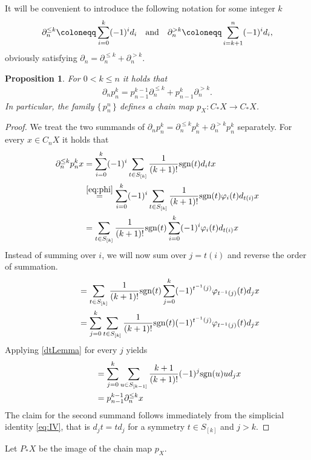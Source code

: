 \documentclass[12pt]{amsart}
\theoremstyle{plain}
\numberwithin{lemma}{\DefaultNumberTheoremWithin}
\numberwithin{claim}{\DefaultNumberTheoremWithin}
\numberwithin{theorem}{\DefaultNumberTheoremWithin}
\numberwithin{corollary}{\DefaultNumberTheoremWithin}
\newtheorem{proposition}{Proposition}
\numberwithin{proposition}{\DefaultNumberTheoremWithin}
\numberwithin{conjecture}{\DefaultNumberTheoremWithin}
\theoremstyle{definition}
\theoremstyle{definition}
\numberwithin{question}{\DefaultNumberTheoremWithin}
\theoremstyle{definition}
\numberwithin{problem}{\DefaultNumberTheoremWithin}
\theoremstyle{remark}
\numberwithin{remark}{\DefaultNumberTheoremWithin}
\theoremstyle{remark}
\numberwithin{example}{\DefaultNumberTheoremWithin}
\def\blt{*}
\def\letbe{\coloneqq}
\def\sgn{\textnormal{sgn}}
\def\symtowermap{\varphi}
\newcommand{\del}{\partial}
\newcommand{\Sym}[1]{S_{[#1]}}
\newcommand{\argdel}[2]{\del^{#1}_{#2}}
\newcommand{\pmap}[2]{p_{#2}^{#1}}
\begin{document}
 It will be convenient to introduce the following notation for some integer $k$ 
\[
    \argdel{\leq k}{n}\letbe \sum_{i=0}^k (-1)^{i}d_i\quad \textnormal{and}\quad \argdel{>k}{n}\letbe\sum_{i=k+1}^{n}(-1)^{i}d_i,
\]
obviously satisfying $\del_n=\argdel{\leq k}{n}+\argdel{>k}{n}$.
\begin{proposition}
    For $0<k\leq n$ it holds that
    \begin{align*}
    \del_n \pmap{k}{n} = \pmap{k-1}{n-1}\argdel{\leq k}{n}+\pmap{k}{n-1}\argdel{>k}{n}.
    \end{align*}
    In particular, the family $\{\,\pmap{n}{n}\,\}$ defines a chain map $p_X:C_\blt X\to C_\blt X$.
\end{proposition}
\begin{proof}
  We treat the two summands of $\del_n \pmap{k}{n}=\argdel{\leq k}{n}\pmap{k}{n}+\argdel{>k}{n}\pmap{k}{n}$ separately. For every $x\in C_nX$ it holds that
  \begin{align*}
    \argdel{\leq k}{n}\pmap{k}{n} x&=\sum_{i=0}^k(-1)^i\sum_{t\in \Sym{k}}\frac{1}{(k+1)!}\sgn(t)d_itx\\
    &\overset{\eqref{eq:phi}}{=} \sum_{i=0}^k(-1)^i\sum_{t\in \Sym{k}}\frac{1}{(k+1)!}\sgn(t)\symtowermap_i(t)d_{t(i)}x\\
    &=\sum_{t\in \Sym{k}}\frac{1}{(k+1)!}\sgn(t)\sum_{i=0}^k(-1)^i\symtowermap_i(t)d_{t(i)}x
  \end{align*}
Instead of summing over $i$, we will now sum over $j=t(i)$ and reverse the order of summation.
\begin{align*}
    \phantom{\argdel{\leq k}{n} \pmap{k}{n}}&=\sum_{t\in \Sym{k}}\frac{1}{(k+1)!}\sgn(t)\sum_{j=0}^k(-1)^{t^{-1}(j)}\symtowermap_{t^{-1}(j)}(t)d_{j}x\\
    &=\sum_{j=0}^k\sum_{t\in \Sym{k}}\frac{1}{(k+1)!}\sgn(t)(-1)^{t^{-1}(j)}\symtowermap_{t^{-1}(j)}(t)d_{j}x
\end{align*}
Applying \ref{dtLemma} for every $j$ yields
\begin{align*}
\phantom{d_{\leq k}\pmap{k}{n}}&=\sum_{j=0}^k\sum_{u\in \Sym{k-1}}\frac{k+1}{(k+1)!}(-1)^{j}\sgn(u)ud_{j}x\\
&=\pmap{k-1}{n-1}\argdel{\leq k}{n} x
\end{align*}
The claim for the second summand follows immediately from the simplicial identity \eqref{eq:IV}, that is $d_jt=td_j$ for a symmetry $t\in \Sym{k}$ 
and $j>k$. 
\end{proof}

Let $P_\blt X$ be the image of the chain map $p_X$.
\end{document}
